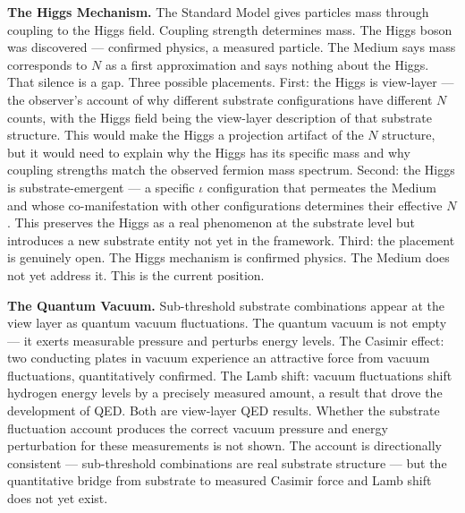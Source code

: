 \documentclass[11pt,letterpaper]{article}
\begin{document}
\textbf{The Higgs Mechanism.} The Standard Model gives particles mass through coupling to the Higgs field. Coupling strength determines mass. The Higgs boson was discovered --- confirmed physics, a measured particle. The Medium says mass corresponds to \(N\) as a first approximation and says nothing about the Higgs. That silence is a gap. Three possible placements. First: the Higgs is view-layer --- the observer's account of why different substrate configurations have different \(N\) counts, with the Higgs field being the view-layer description of that substrate structure. This would make the Higgs a projection artifact of the \(N\) structure, but it would need to explain why the Higgs has its specific mass and why coupling strengths match the observed fermion mass spectrum. Second: the Higgs is substrate-emergent --- a specific \(\iota\) configuration that permeates the Medium and whose co-manifestation with other configurations determines their effective \(N\). This preserves the Higgs as a real phenomenon at the substrate level but introduces a new substrate entity not yet in the framework. Third: the placement is genuinely open. The Higgs mechanism is confirmed physics. The Medium does not yet address it. This is the current position.

\textbf{The Quantum Vacuum.} Sub-threshold substrate combinations appear at the view layer as quantum vacuum fluctuations. The quantum vacuum is not empty --- it exerts measurable pressure and perturbs energy levels. The Casimir effect: two conducting plates in vacuum experience an attractive force from vacuum fluctuations, quantitatively confirmed. The Lamb shift: vacuum fluctuations shift hydrogen energy levels by a precisely measured amount, a result that drove the development of QED. Both are view-layer QED results. Whether the substrate fluctuation account produces the correct vacuum pressure and energy perturbation for these measurements is not shown. The account is directionally consistent --- sub-threshold combinations are real substrate structure --- but the quantitative bridge from substrate to measured Casimir force and Lamb shift does not yet exist.
\end{document}

